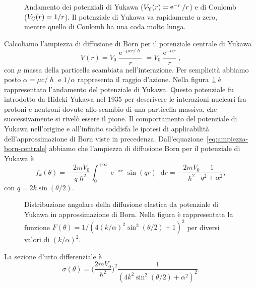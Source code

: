 \documentclass[a4paper,fleqn,twoside,12pt]{article}
\newcommand*{\dd}{\mathop{}\!\mathrm{d}} %
\DeclareMathOperator{\e}{\mathrm{e}} %
\begin{document}
\begin{figure}
  \centering
  
  \caption{Andamento dei potenziali di Yukawa ($V_{\textup{Y}}(r) = \e^{-r}/r$)
    e di Coulomb ($V_{\textup{C}}(r)=1/r$).  Il potenziale di Yukawa va
    rapidamente a zero, mentre quello di Coulomb ha una coda molto lunga.}
  \label{fig:pot-yukawa}
\end{figure}
Calcoliamo l'ampiezza di diffusione di Born per il potenziale centrale di Yukawa
\begin{equation}
  V(r) = V_{0}\frac{\e^{-\mu cr/\hslash}}{r} = V_{0}\frac{\e^{-\alpha r}}{r},
\end{equation}
con $\mu$ massa della particella scambiata nell'interazione.
Per semplicità abbiamo posto $\alpha = \mu c/\hslash$ e $1/\alpha$ rappresenta
il raggio d'azione.  Nella figura~\ref{fig:pot-yukawa} è rappresentato
l'andamento del potenziale di Yukawa.  Questo potenziale fu introdotto da Hideki
Yukawa nel 1935 per descrivere le interazioni nucleari fra protoni e neutroni
dovute allo scambio di una particella massiva, che successivamente si rivelò
essere il pione.
Il comportamento del potenziale di Yukawa nell'origine e all'infinito soddisfa
le ipotesi di applicabilità dell'approssimazione di Born viste in precedenza.
Dall'equazione~\eqref{eq:ampiezza-born-centrale} abbiamo che l'ampiezza di
diffusione Born per il potenziale di Yukawa è
\begin{equation}
  f_{k}(\theta) = -\frac{2mV_{0}}{q\hslash^{2}} \int_{0}^{+\infty} \e^{-\alpha
    r}\sin(qr)\dd r = -\frac{2mV_{0}}{\hslash^{2}} \frac{1}{q^{2} + \alpha^{2}},
\end{equation}
con $q = 2k\sin(\theta/2)$.
\begin{figure}
  \centering
  
  \caption{Distribuzione angolare della diffusione elastica da potenziale di
    Yukawa in approssimazione di Born.  Nella figura è rappresentata la funzione
    $F(\theta) = 1/(4(k/\alpha)^{2}\sin^{2}(\theta/2)+1)^{2}$ per diversi valori
    di $(k/\alpha)^{2}$.}
  \label{fig:sez-urto-yukawa}
\end{figure}
La sezione d'urto differenziale è
\begin{equation}
  \label{eq:sezione-yukawa}
  \sigma(\theta) = \bigg(\frac{2mV_{0}}{\hslash^{2}}\bigg)^{2}
  \frac{1}{(4k^{2}\sin^{2}(\theta/2) + \alpha^{2})^{2}}.
\end{equation}
\end{document}
